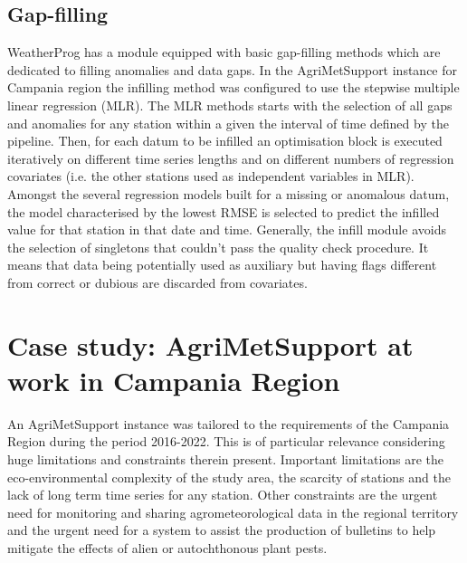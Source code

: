 \documentclass[authoryear,preprint,review,12pt]{elsarticle}
\newcommand{\note}[1]{\emph{\textcolor{red}{#1}}}
\newcommand{\review}[1]{\emph{\textcolor{cyan}{#1}}}
\begin{document}


\subsection{Gap-filling} \label{sec:infill}

WeatherProg has a module equipped with basic gap-filling methods which are dedicated to filling anomalies and data gaps.
In the AgriMetSupport instance for Campania region the infilling method was configured to use the stepwise multiple linear regression (MLR).
The MLR methods starts with the selection of all gaps and anomalies for any station within a given the interval of time defined by the pipeline.
Then, for each datum to be infilled an optimisation block is executed iteratively on different time series lengths and on different numbers of regression covariates (i.e. the other stations used as independent variables in MLR).
Amongst the several regression models built for a missing or anomalous datum, the model characterised by the lowest RMSE is selected to predict the infilled value for that station in that date and time.
Generally, the infill module avoids the selection of singletons that couldn't pass the quality check procedure. 
It means that data being potentially used as auxiliary but having flags different from correct or dubious are discarded from covariates.

\section{Case study: Agri\-Met\-Support at work in Campania Region} \label{sec:casestudy}

An Agri\-Met\-Support instance was tailored to the requirements of the Campania Region during the period 2016-2022.
This is of particular relevance considering huge limitations and constraints therein present.
Important limitations are the eco-environmental complexity of the study area, the scarcity of stations and the lack of long term time series for any station.
Other constraints are the urgent need for monitoring and sharing agrometeorological data in the regional territory %
and the urgent need for a system to assist the production of bulletins to help mitigate the effects of alien or autochthonous plant pests.
 
\end{document}
